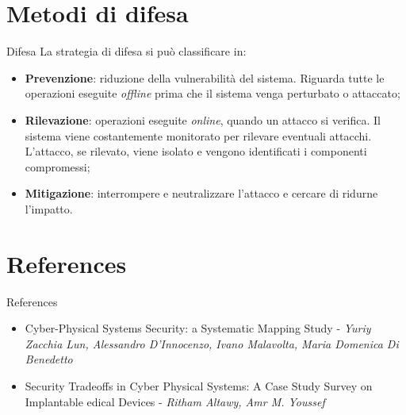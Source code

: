 \documentclass{beamer}
\begin{document}
\section{Metodi di difesa}
\begin{frame}{Difesa}
    La strategia di difesa si può classificare in:
    \begin{itemize}
        \item \textbf{Prevenzione}: riduzione della vulnerabilità del sistema. Riguarda tutte le operazioni eseguite \textit{offline} prima che il sistema venga 
        perturbato o attaccato;
        \item \textbf{Rilevazione}: operazioni eseguite \textit{online}, quando un attacco si verifica. Il sistema viene costantemente monitorato per rilevare
        eventuali attacchi. L'attacco, se rilevato, viene isolato e vengono identificati i componenti compromessi;
        \item \textbf{Mitigazione}: interrompere e neutralizzare l'attacco e cercare di ridurne l'impatto.
    \end{itemize}
    
\end{frame}

\section{References}
\begin{frame}{References}
    \begin{itemize}
        \item Cyber-Physical Systems Security: a Systematic Mapping Study - \textit{Yuriy Zacchia Lun, Alessandro D’Innocenzo, Ivano Malavolta, Maria Domenica Di Benedetto}
        \item Security Tradeoffs in Cyber Physical Systems: A Case Study Survey on Implantable edical Devices - \textit{Ritham Altawy, Amr M. Youssef}
    \end{itemize}
    
\end{frame}
\end{document}
